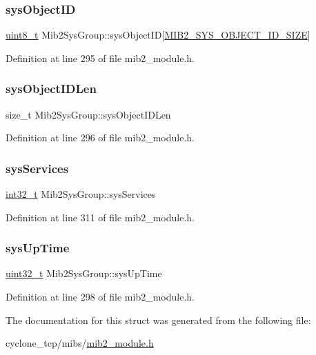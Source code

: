 \subsubsection{\texorpdfstring{sys\+Object\+ID}{sysObjectID}}
{\footnotesize\ttfamily \hyperlink{stdint_8h_aba7bc1797add20fe3efdf37ced1182c5}{uint8\+\_\+t} Mib2\+Sys\+Group\+::sys\+Object\+ID\mbox{[}\hyperlink{mib2__module_8h_ad2e57875dbc8bd329c10dc6516506292}{M\+I\+B2\+\_\+\+S\+Y\+S\+\_\+\+O\+B\+J\+E\+C\+T\+\_\+\+I\+D\+\_\+\+S\+I\+ZE}\mbox{]}}



Definition at line 295 of file mib2\+\_\+module.\+h.

\mbox{\label{structMib2SysGroup_a63e95d72c5b675f304680e3f0706401a}} 
\subsubsection{\texorpdfstring{sys\+Object\+I\+D\+Len}{sysObjectIDLen}}
{\footnotesize\ttfamily size\+\_\+t Mib2\+Sys\+Group\+::sys\+Object\+I\+D\+Len}



Definition at line 296 of file mib2\+\_\+module.\+h.

\mbox{\label{structMib2SysGroup_a850b9d656996116ef8ece5606ad4b8bc}} 
\subsubsection{\texorpdfstring{sys\+Services}{sysServices}}
{\footnotesize\ttfamily \hyperlink{stdint_8h_ab1967d8591af1a4e48c37fd2b0f184d0}{int32\+\_\+t} Mib2\+Sys\+Group\+::sys\+Services}



Definition at line 311 of file mib2\+\_\+module.\+h.

\mbox{\label{structMib2SysGroup_a6070d9b761f1ad532fa76fb8095a4256}} 
\subsubsection{\texorpdfstring{sys\+Up\+Time}{sysUpTime}}
{\footnotesize\ttfamily \hyperlink{stdint_8h_a435d1572bf3f880d55459d9805097f62}{uint32\+\_\+t} Mib2\+Sys\+Group\+::sys\+Up\+Time}



Definition at line 298 of file mib2\+\_\+module.\+h.



The documentation for this struct was generated from the following file\+:\begin{DoxyCompactItemize}
\item 
cyclone\+\_\+tcp/mibs/\hyperlink{mib2__module_8h}{mib2\+\_\+module.\+h}\end{DoxyCompactItemize}
